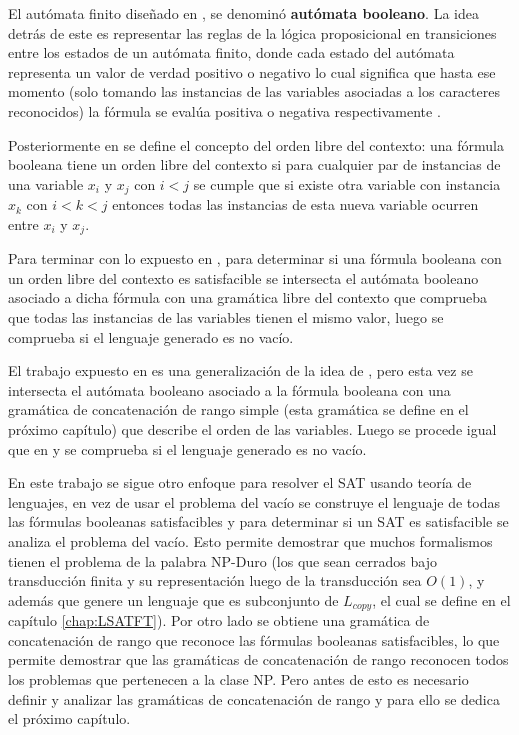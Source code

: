El autómata finito diseñado en \cite{aCFSAT}, se denominó \textbf{autómata booleano}. La idea detrás de este es representar 
las reglas de la lógica proposicional en transiciones entre los estados de un autómata finito, donde cada estado del autómata representa un valor de verdad positivo o 
negativo lo cual significa que hasta ese momento (solo tomando las instancias de las variables asociadas a los 
caracteres reconocidos) la fórmula se evalúa positiva o negativa respectivamente \cite{aCFSAT}.

Posteriormente en \cite{aCFSAT} se define el concepto del orden libre del contexto: una fórmula booleana tiene un orden libre del contexto si para cualquier par de instancias de una variable $x_i$ y $x_j$ con $i<j$ se
cumple que si existe otra variable con instancia $x_k$ con $i<k<j$ entonces todas las instancias de esta nueva
variable ocurren entre $x_i$ y $x_j$.

Para terminar con lo expuesto en \cite{aCFSAT}, para determinar si una fórmula booleana con un orden libre del contexto 
es satisfacible se intersecta el autómata booleano asociado a dicha fórmula con una gramática libre del contexto 
que comprueba que todas las instancias de las variables tienen el mismo valor, luego se comprueba si el lenguaje
generado es no vacío.

El trabajo expuesto en \cite{aSRCSAT} es una generalización de la idea de \cite{aCFSAT}, pero esta vez se intersecta
el autómata booleano asociado a la fórmula booleana con una gramática de concatenación de rango simple (esta gramática
se define en el próximo capítulo) que describe el orden de las variables. Luego se procede igual que en \cite{aCFSAT}
y se comprueba si el lenguaje generado es no vacío.

En este trabajo se sigue otro enfoque para resolver el SAT usando teoría de lenguajes, en vez de usar el problema
del vacío se construye el lenguaje de todas las fórmulas booleanas satisfacibles y para determinar si un SAT
es satisfacible se analiza el problema del vacío. Esto permite demostrar que muchos formalismos tienen el problema
de la palabra NP-Duro (los que sean cerrados bajo transducción finita y su representación luego de la transducción sea $O(1)$,
y además que genere un lenguaje que es subconjunto de $L_{copy}$, el cual se define en el capítulo \ref{chap:LSATFT}). Por otro lado se obtiene
una gramática de concatenación de rango que reconoce las fórmulas booleanas satisfacibles, lo que permite demostrar
que las gramáticas de concatenación de rango reconocen todos los problemas que pertenecen a la clase NP. Pero antes 
de esto es necesario definir y analizar las gramáticas de concatenación de rango y para ello se dedica el próximo capítulo.
